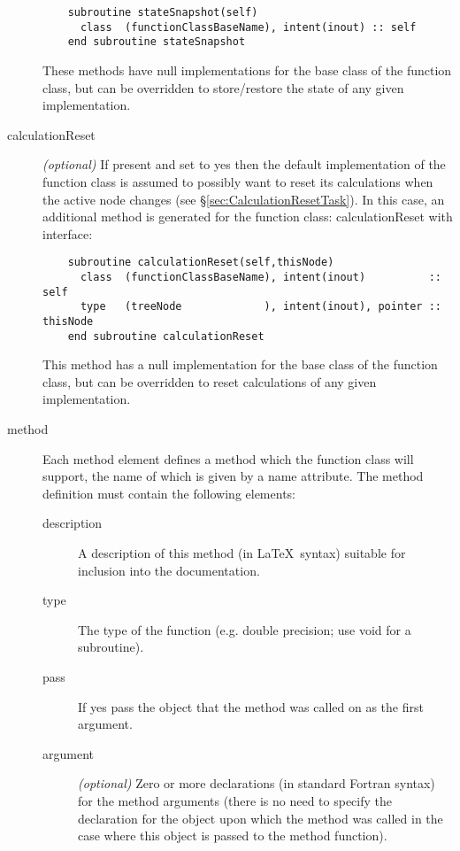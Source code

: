 \begin{description}
\begin{lstlisting}
    subroutine stateSnapshot(self)
      class  (functionClassBaseName), intent(inout) :: self
    end subroutine stateSnapshot
  \end{lstlisting}
  These methods have null implementations for the base class of the function class, but can be overridden to store/restore the state of any given implementation.
\item[{\normalfont \ttfamily calculationReset}] \emph{(optional)} If present and set to {\normalfont \ttfamily yes} then the default implementation of the function class is assumed to possibly want to reset its calculations when the active \gls{node} changes (see \S\ref{sec:CalculationResetTask}). In this case, an additional method is generated for the function class: {\normalfont \ttfamily calculationReset} with interface:
  \begin{lstlisting}
    subroutine calculationReset(self,thisNode)
      class  (functionClassBaseName), intent(inout)          :: self
      type   (treeNode             ), intent(inout), pointer :: thisNode
    end subroutine calculationReset
  \end{lstlisting}
  This method has a null implementation for the base class of the function class, but can be overridden to reset calculations of any given implementation.
\item[{\normalfont \ttfamily method}] Each {\normalfont \ttfamily method} element defines a method which the function class will support, the name of which is given by a {\normalfont \ttfamily name} attribute. The method definition must contain the following elements:
  \begin{description}
  \item[{\normalfont \ttfamily description}] A description of this method (in \LaTeX\ syntax) suitable for inclusion into the documentation.
  \item[{\normalfont \ttfamily type}] The type of the function (e.g. {\normalfont \ttfamily double precision}; use {\normalfont \ttfamily void} for a subroutine).
  \item[{\normalfont \ttfamily pass}] If {\normalfont \ttfamily yes} pass the object that the method was called on as the first argument.
  \item[{\normalfont \ttfamily argument}] \emph{(optional)} Zero or more declarations (in standard Fortran syntax) for the method arguments (there is no need to specify the declaration for the object upon which the method was called in the case where this object is passed to the method function).
  \end{description}
\end{description}

